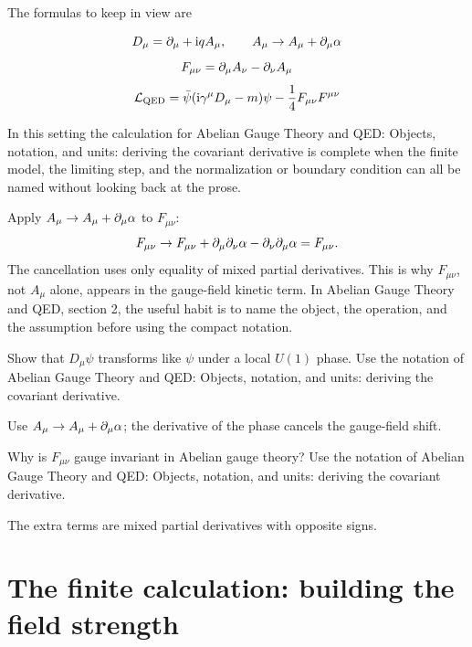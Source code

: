The formulas to keep in view are

\[
  D_\mu=\partial_\mu+\mathrm i qA_\mu,\qquad A_\mu\to A_\mu+\partial_\mu\alpha
\]
\[
  F_{\mu\nu}=\partial_\mu A_\nu-\partial_\nu A_\mu
\]
\[
  \mathcal L_{\mathrm{QED}}=\bar\psi(\mathrm i\gamma^\mu D_\mu-m)\psi-\frac14F_{\mu\nu}F^{\mu\nu}
\]

In this setting the calculation for Abelian Gauge Theory and QED: Objects, notation, and units: deriving the covariant derivative is complete when the finite model, the limiting step, and the normalization or boundary condition can all be named without looking back at the prose.




\begin{example}
Apply \(A_\mu\to A_\mu+\partial_\mu\alpha\) to \(F_{\mu\nu}\):
\[
  F_{\mu\nu}\to F_{\mu\nu}+\partial_\mu\partial_\nu\alpha-\partial_\nu\partial_\mu\alpha=F_{\mu\nu}.
\]
The cancellation uses only equality of mixed partial derivatives.  This is why \(F_{\mu\nu}\), not \(A_\mu\) alone, appears in the gauge-field kinetic term.  In Abelian Gauge Theory and QED, section 2, the useful habit is to name the object, the operation, and the assumption before using the compact notation.
\end{example}



\begin{exercise}
Show that \(D_\mu\psi\) transforms like \(\psi\) under a local \(U(1)\) phase.  Use the notation of Abelian Gauge Theory and QED: Objects, notation, and units: deriving the covariant derivative.
\begin{answer}
Use \(A_\mu\to A_\mu+\partial_\mu\alpha\); the derivative of the phase cancels the gauge-field shift.
\end{answer}
\end{exercise}

\begin{exercise}
Why is \(F_{\mu\nu}\) gauge invariant in Abelian gauge theory?  Use the notation of Abelian Gauge Theory and QED: Objects, notation, and units: deriving the covariant derivative.
\begin{answer}
The extra terms are mixed partial derivatives with opposite signs.
\end{answer}
\end{exercise}



\section{The finite calculation: building the field strength}

